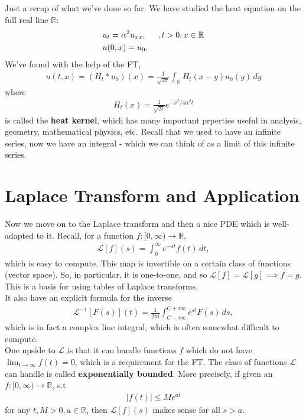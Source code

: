 \documentclass{article}
\theoremstyle{definition}
\newcommand{\R}{\mathbb{R}}
\newcommand{\lag}{\mathcal{L}}
\newcommand{\al}{\alpha}
\newcommand{\f}[2]{\frac{#1}{#2}}
\newcommand{\ift}{\infty}
\begin{document}
Just a recap of what we've done so far: We have studied the heat equation on the full real line $\R$:
\begin{align*}
&u_t = \al^2 u_{xx}, \hspace{0.5cm}, t>0, x\in \R\\
&u(0,x) = u_0.
\end{align*}
We've found with the help of the FT, 
\begin{align*}
u(t,x) = (H_t \ast u_0)(x) = \f{1}{\sqrt{2\pi}}\int_\R H_t(x-y)u_0(y)\,dy
\end{align*}
where
\begin{align*}
H_t(x) = \f{1}{\sqrt{2t}} e^{-x^2/4\al^2 t}
\end{align*}
is called the \textbf{heat kernel}, which has many important prperties useful in analysis, geometry, mathematical physics, etc. Recall that we used to have an infinite series, now we have an integral - which we can think of as a limit of this infinite series.

\newpage

\section{Laplace Transform and Application}

Now we move on to the Laplace transform and then a nice PDE which is well-adapted to it. Recall, for a function $f : [0,\ift) \to \R$,
\begin{align*}
\lag[f](s) = \int_0^\infty e^{-st}f(t)\,dt,
\end{align*}
which is easy to compute. This map is invertible on a certain class of functions (vector space). So, in particular, it is one-to-one, and so $\lag[f] = \lag[g] \implies f=g$. This is a basis for using tables of Laplace transforms.\\

It also have an explicit formula for the inverse
\begin{align*}
\lag^{-1}[F(s)](t) = \f{1}{2\pi i}\int_{C-i\infty}^{C+ i\infty}e^{st}F(s)\,ds,
\end{align*}
which is in fact a complex line integral, which is often somewhat difficult to compute. \\

One upside to $\lag$ is that it can handle functions $f$ which do not have $\lim_{t\to \ift} f(t) = 0$, which is a requirement for the FT. The class of functions $\lag$ can handle is called \textbf{exponentially bounded}. More precisely, if given an $f : [0,\ift) \to \R$, s.t 
\begin{align*}
\vert f(t) \vert \leq Me^{at}
\end{align*}
for any $t, M > 0, a\in\R$, then $\lag[f](s)$ makes sense for all $s>a$.\\
\end{document}
